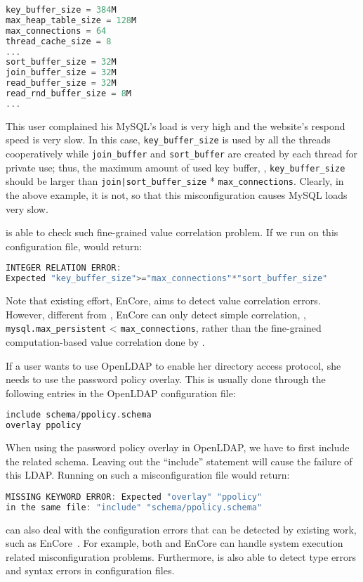 \begin{lstlisting}[language=C]
key_buffer_size = 384M
max_heap_table_size = 128M
max_connections = 64
thread_cache_size = 8
...
sort_buffer_size = 32M
join_buffer_size = 32M
read_buffer_size = 32M
read_rnd_buffer_size = 8M
...
\end{lstlisting} 

This user complained his MySQL's load is very high and the website's
respond speed is very slow.
In this case, {\tt key\_buffer\_size} is used by all the threads
cooperatively while {\tt join\_buffer} and {\tt sort\_buffer} are 
created by each thread for private use; thus, the maximum amount
of used key buffer, \ie, {\tt key\_buffer\_size} should be larger than 
{\tt join|sort\_buffer\_size} * {\tt max\_connections}. 
Clearly, in the above example, it is not, so that this misconfiguration
causes MySQL loads very slow.

\app is able to check such fine-grained value correlation problem.
If we run \app on this configuration file, \app  would return:

\begin{lstlisting}[language=C]
INTEGER RELATION ERROR:
Expected "key_buffer_size">="max_connections"*"sort_buffer_size"
\end{lstlisting} 

Note that existing effort, EnCore, aims to detect value correlation 
errors. However, different from \app, EnCore can only detect simple
correlation, \eg, {\tt mysql.max\_persistent} < {\tt max\_connections},
rather than the fine-grained computation-based value correlation
done by \app.

If a user wants to use OpenLDAP to enable her directory access
protocol, she needs to use the password policy overlay. This is usually
done through the following entries in the OpenLDAP configuration file:

\begin{lstlisting}[language=C]
include schema/ppolicy.schema
overlay ppolicy
\end{lstlisting} 

When using the password policy overlay in OpenLDAP, 
we have to first include the related schema.
Leaving out the ``include'' statement will cause the failure of 
this LDAP. Running \app on such a misconfiguration file would return:

\begin{lstlisting}[language=C]
MISSING KEYWORD ERROR: Expected "overlay" "ppolicy"
in the same file: "include" "schema/ppolicy.schema"
\end{lstlisting} 


\app can also deal with the configuration errors that can be detected by
existing work, such as EnCore~\cite{zhang14encore}.
For example, both \app and EnCore can handle system execution related
misconfiguration problems.
Furthermore, \app is also able to detect type errors and syntax errors
in configuration files.
